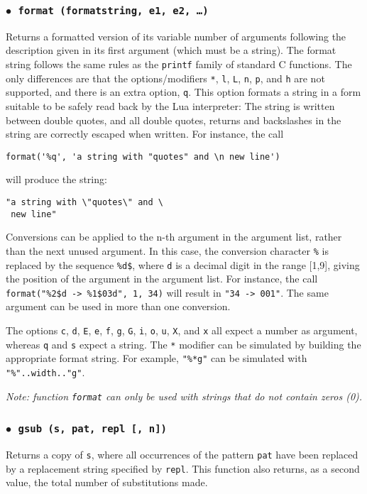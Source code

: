 \documentclass[11pt]{article}
\newcommand{\T}[1]{{\tt #1}}
\newcommand{\Deffunc}[1]{\index{#1}}
\newcommand{\ff}{$\bullet$\ }
\begin{document}
\subsubsection*{\ff \T{format (formatstring, e1, e2, \ldots)}}\Deffunc{format}
\label{format}
Returns a formatted version of its variable number of arguments
following the description given in its first argument (which must be a string).
The format string follows the same rules as the \verb|printf| family of
standard C functions.
The only differences are that the options/modifiers
\verb|*|, \verb|l|, \verb|L|, \verb|n|, \verb|p|,
and \verb|h| are not supported,
and there is an extra option, \verb|q|.
This option formats a string in a form suitable to be safely read
back by the Lua interpreter:
The string is written between double quotes,
and all double quotes, returns and backslashes in the string
are correctly escaped when written.
For instance, the call
\begin{verbatim}
format('%q', 'a string with "quotes" and \n new line')
\end{verbatim}
will produce the string:
\begin{verbatim}
"a string with \"quotes\" and \
 new line"
\end{verbatim}

Conversions can be applied to the n-th argument in the argument list,
rather than the next unused argument.
In this case, the conversion character \verb|%| is replaced
by the sequence \verb|%d$|, where \verb|d| is a
decimal digit in the range [1,9],
giving the position of the argument in the argument list.
For instance, the call \verb|format("%2$d -> %1$03d", 1, 34)| will
result in \verb|"34 -> 001"|.
The same argument can be used in more than one conversion.

The options \verb|c|, \verb|d|, \verb|E|, \verb|e|, \verb|f|,
\verb|g|, \verb|G|, \verb|i|, \verb|o|, \verb|u|, \verb|X|, and \verb|x| all
expect a number as argument,
whereas \verb|q| and \verb|s| expect a string.
The \verb|*| modifier can be simulated by building
the appropriate format string.
For example, \verb|"%*g"| can be simulated with
\verb|"%"..width.."g"|.

\emph{Note: function \T{format} can only be used with strings that do not
contain zeros (0).}

\subsubsection*{\ff \T{gsub (s, pat, repl [, n])}}
\Deffunc{gsub}
Returns a copy of \verb|s|,
where all occurrences of the pattern \verb|pat| have been
replaced by a replacement string specified by \verb|repl|.
This function also returns, as a second value,
the total number of substitutions made.
\end{document}
